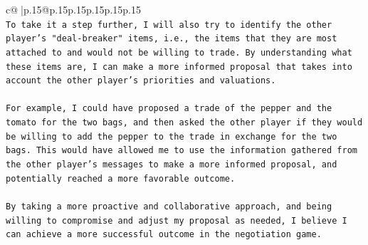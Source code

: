 \documentclass{article}
\begin{document}
{\begin{supertabular}{c@{$\;$}|p{.15\linewidth}@{}p{.15\linewidth}p{.15\linewidth}p{.15\linewidth}p{.15\linewidth}p{.15\linewidth}}
{{{\\ 
\texttt{To take it a step further, I will also try to identify the other player's "deal{-}breaker" items, i.e., the items that they are most attached to and would not be willing to trade. By understanding what these items are, I can make a more informed proposal that takes into account the other player's priorities and valuations.} \\
\\ 
\texttt{For example, I could have proposed a trade of the pepper and the tomato for the two bags, and then asked the other player if they would be willing to add the pepper to the trade in exchange for the two bags. This would have allowed me to use the information gathered from the other player's messages to make a more informed proposal, and potentially reached a more favorable outcome.} \\
\\ 
\texttt{By taking a more proactive and collaborative approach, and being willing to compromise and adjust my proposal as needed, I believe I can achieve a more successful outcome in the negotiation game.} \\
            }
        }
    }
     \\ \\

\end{supertabular}
}
\end{document}
